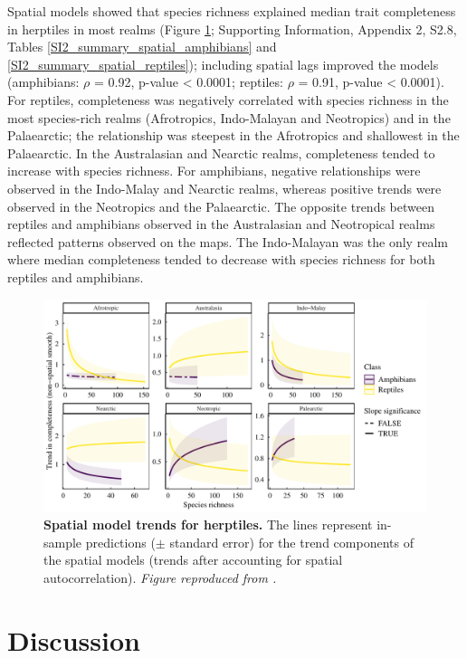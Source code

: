 Spatial models showed that species richness explained median trait completeness in herptiles in most realms (Figure \ref{2_Trends}; Supporting Information, Appendix 2, S2.8, Tables \ref{SI2_summary_spatial_amphibians} and \ref{SI2_summary_spatial_reptiles}); including spatial lags improved the models (amphibians: $\rho$ = 0.92, p-value < 0.0001; reptiles: $\rho$ = 0.91, p-value < 0.0001). For reptiles, completeness was negatively correlated with species richness in the most species-rich realms (Afrotropics, Indo-Malayan and Neotropics) and in the Palaearctic; the relationship was steepest in the Afrotropics and shallowest in the Palaearctic. In the Australasian and Nearctic realms, completeness tended to increase with species richness. For amphibians, negative relationships were observed in the Indo-Malay and Nearctic realms, whereas positive trends were observed in the Neotropics and the Palaearctic. The opposite trends between reptiles and amphibians observed in the Australasian and Neotropical realms reflected patterns observed on the maps. The Indo-Malayan was the only realm where median completeness tended to decrease with species richness for both reptiles and amphibians.

\clearpage
\begin{figure}[h!]
\centering
\includegraphics[scale=0.75]{figures/Chapter1/Figure_6}
\caption[Spatial model trends for herptiles.]{\textbf{Spatial model trends for herptiles.} The lines represent in-sample predictions ($\pm$ standard error) for the trend components of the spatial models (trends after accounting for spatial autocorrelation). \textit{Figure reproduced from \citet{Etard2020}.}}
\label{2_Trends}
\end{figure}


\section{Discussion}

